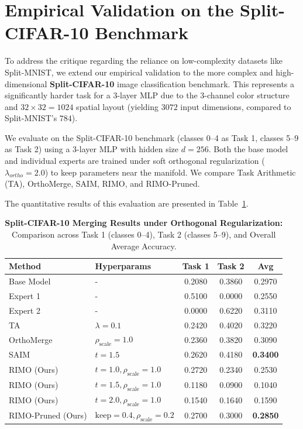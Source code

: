 \section{Empirical Validation on the Split-CIFAR-10 Benchmark}
\label{sec:appendix_cifar10_experiments}

To address the critique regarding the reliance on low-complexity datasets like Split-MNIST, we extend our empirical validation to the more complex and high-dimensional \textbf{Split-CIFAR-10} image classification benchmark. This represents a significantly harder task for a 3-layer MLP due to the 3-channel color structure and $32\times 32 = 1024$ spatial layout (yielding $3072$ input dimensions, compared to Split-MNIST's $784$). 

We evaluate on the Split-CIFAR-10 benchmark (classes 0--4 as Task 1, classes 5--9 as Task 2) using a 3-layer MLP with hidden size $d = 256$. Both the base model and individual experts are trained under soft orthogonal regularization ($\lambda_{ortho} = 2.0$) to keep parameters near the manifold. We compare Task Arithmetic (TA), OrthoMerge, SAIM, RIMO, and RIMO-Pruned.

The quantitative results of this evaluation are presented in Table~\ref{tab:cifar10_results}.

\begin{table}[ht]
\centering
\caption{\textbf{Split-CIFAR-10 Merging Results under Orthogonal Regularization:} Comparison across Task 1 (classes 0--4), Task 2 (classes 5--9), and Overall Average Accuracy.}
\label{tab:cifar10_results}
\vskip 0.05in
\begin{footnotesize}
\begin{sc}
\begin{tabular}{llccc}
\toprule
Method & Hyperparams & Task 1 & Task 2 & Avg \\
\midrule
Base Model & - & 0.2080 & 0.3860 & 0.2970 \\
Expert 1 & - & 0.5100 & 0.0000 & 0.2550 \\
Expert 2 & - & 0.0000 & 0.6220 & 0.3110 \\
\midrule
TA & $\lambda = 0.1$ & 0.2420 & 0.4020 & 0.3220 \\
OrthoMerge & $\rho_{\text{scale}} = 1.0$ & 0.2360 & 0.3820 & 0.3090 \\
SAIM & $t = 1.5$ & 0.2620 & 0.4180 & \textbf{0.3400} \\
\midrule
RIMO (Ours) & $t = 1.0, \rho_{\text{scale}} = 1.0$ & 0.2720 & 0.2340 & 0.2530 \\
RIMO (Ours) & $t = 1.5, \rho_{\text{scale}} = 1.0$ & 0.1180 & 0.0900 & 0.1040 \\
RIMO (Ours) & $t = 2.0, \rho_{\text{scale}} = 1.0$ & 0.1540 & 0.1640 & 0.1590 \\
\midrule
RIMO-Pruned (Ours) & $\text{keep} = 0.4, \rho_{\text{scale}} = 0.2$ & 0.2700 & 0.3000 & \textbf{0.2850} \\
\bottomrule
\end{tabular}
\end{sc}
\end{footnotesize}
\vskip -0.1in
\end{table}

